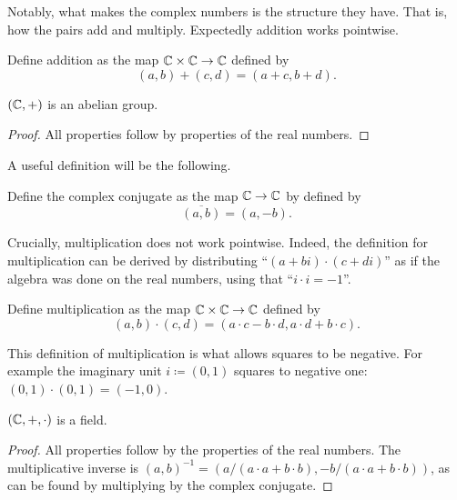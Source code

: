 \documentclass[../main.tex]{subfiles}
\begin{document}
Notably, what makes the complex numbers is the structure they have. That is, how the pairs add and multiply. Expectedly addition works pointwise.
\begin{definition}
    Define addition as the map $\mathbb{C}\times\mathbb{C}\to\mathbb{C}$ defined by
    \begin{equation*}
        (a,b)+(c,d)=(a+c,b+d).
    \end{equation*}
\end{definition}
\begin{proposition}\label{prp:the_complex_numbers:abelian_group_complex_numbers}
    $(\mathbb{C},+)$ is an abelian group.
\end{proposition}
\begin{proof}
    All properties follow by properties of the real numbers.
\end{proof}
A useful definition will be the following.
\begin{definition}
    Define the complex conjugate as the map $\mathbb{C}\to\mathbb{C}$ by defined by
    \begin{equation*}
        \overline{(a,b)}=(a,-b).
    \end{equation*}
\end{definition}
Crucially, multiplication does not work pointwise. Indeed, the definition for multiplication can be derived by distributing ``$(a+bi)\cdot(c+di)$'' as if the algebra was done on the real numbers, using that ``$i\cdot i=-1$''.
\begin{definition}
    Define multiplication as the map $\mathbb{C}\times\mathbb{C}\to\mathbb{C}$ defined by
    \begin{equation*}
        (a,b)\cdot(c,d)=(a\cdot c-b\cdot d,a\cdot d+b\cdot c).
    \end{equation*}
\end{definition}
This definition of multiplication is what allows squares to be negative. For example the imaginary unit $i\coloneq(0,1)$ squares to negative one: $(0,1)\cdot(0,1)=(-1,0)$.
\begin{proposition}\label{prp:the_complex_numbers:field_complex_numbers}
    $(\mathbb{C},+,\cdot)$ is a field.
\end{proposition}
\begin{proof}
    All properties follow by the properties of the real numbers. The multiplicative inverse is $(a,b)^{-1}=(a/(a\cdot a+b\cdot b),-b/(a\cdot a+b\cdot b))$, as can be found by multiplying by the complex conjugate.
\end{proof}
\end{document}
